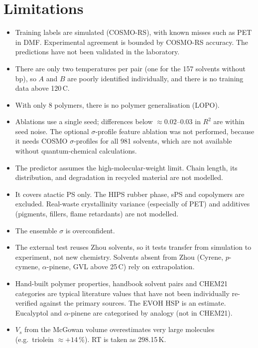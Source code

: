 \documentclass[11pt,a4paper]{article}
\begin{document}
\section{Limitations}
\begin{itemize}
\item Training labels are simulated (COSMO-RS), with known misses such as PET in DMF. Experimental
agreement is bounded by COSMO-RS accuracy. The predictions have not been validated in the laboratory.
\item There are only two temperatures per pair (one for the 157 solvents without bp), so $A$ and $B$ are
poorly identified individually, and there is no training data above 120\,\textdegree C.
\item With only 8 polymers, there is no polymer generalisation (LOPO).
\item Ablations use a single seed; differences below $\approx0.02$--$0.03$ in $R^2$ are within seed
noise. The optional $\sigma$-profile feature ablation was not performed, because it needs COSMO
$\sigma$-profiles for all 981 solvents, which are not available without quantum-chemical calculations.
\item The predictor assumes the high-molecular-weight limit. Chain length, its distribution, and
degradation in recycled material are not modelled.
\item It covers atactic PS only. The HIPS rubber phase, sPS and copolymers are excluded. Real-waste
crystallinity variance (especially of PET) and additives (pigments, fillers, flame retardants) are not
modelled.
\item The ensemble $\sigma$ is overconfident.
\item The external test reuses Zhou solvents, so it tests transfer from simulation to experiment, not new
chemistry. Solvents absent from Zhou (Cyrene, $p$-cymene, $\alpha$-pinene, GVL above 25\,\textdegree C)
rely on extrapolation.
\item Hand-built polymer properties, handbook solvent pairs and CHEM21 categories are typical literature
values that have not been individually re-verified against the primary sources. The EVOH HSP is an
estimate. Eucalyptol and $\alpha$-pinene are categorised by analogy (not in CHEM21).
\item $V_s$ from the McGowan volume overestimates very large molecules (e.g.\ triolein $\approx+14$\,\%).
RT is taken as 298.15\,K.
\end{itemize}
\end{document}
